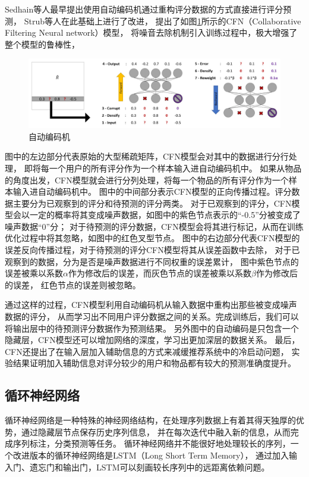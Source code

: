 Sedhain等人\parencite{sedhain2015autorec}最早提出使用自动编码机通过重构评分数据的方式直接进行评分预测，
Strub等人\parencite{strub2016hybrid}在此基础上进行了改进，
提出了如图\ref{fig:ae}所示的CFN（Collaborative Filtering Neural network）模型，
将噪音去除机制引入训练过程中，极大增强了整个模型的鲁棒性，

\begin{figure}[htbp]
\centering
\includegraphics[scale=0.22]{images/ae.jpeg}
\caption{自动编码机}
\label{fig:ae}
\end{figure}

图中的左边部分代表原始的大型稀疏矩阵，CFN模型会对其中的数据进行分行处理，
即将每一个用户的所有评分作为一个样本输入进自动编码机中。
如果从物品的角度出发，CFN模型就会进行分列处理，将每一个物品的所有评分作为一个样本输入进自动编码机中。
图中的中间部分表示CFN模型的正向传播过程。评分数据主要分为已观察到的评分和待预测的评分两类。
对于已观察到的评分，CFN模型会以一定的概率将其变成噪声数据，如图中的紫色节点表示的``-0.5''分被变成了噪声数据``0''分；
对于待预测的评分数据，CFN模型会将其进行标记，从而在训练优化过程中将其忽略，如图中的红色叉型节点。
图中的右边部分代表CFN模型的误差反向传播过程，对于待预测的评分CFN模型将其从误差函数中去除，
对于已观察到的数据，分为是否是噪声数据进行不同权重的误差累计，
图中紫色节点的误差被乘以系数$\alpha$作为修改后的误差，而灰色节点的误差被乘以系数$\beta$作为修改后的误差，
红色节点的误差则被忽略。

通过这样的过程，CFN模型利用自动编码机从输入数据中重构出那些被变成噪声数据的评分，
从而学习出不同用户评分数据之间的关系。完成训练后，我们可以将输出层中的待预测评分数据作为预测结果。
另外图中的自动编码是只包含一个隐藏层，CFN模型还可以增加网络的深度，学习出更加深层的数据关系。
最后，CFN还提出了在输入层加入辅助信息的方式来减缓推荐系统中的冷启动问题，
实验结果证明加入辅助信息对评分较少的用户和物品都有较大的预测准确度提升。

\subsection{循环神经网络}
循环神经网络是一种特殊的神经网络结构，在处理序列数据上有着其得天独厚的优势，通过隐藏层节点保存历史序列信息，
并在每次迭代中融入新的信息，从而完成序列标注，分类预测等任务。
循环神经网络并不能很好地处理较长的序列，一个改进版本的循环神经网络是LSTM（Long Short Term Memory），
通过加入输入门、遗忘门和输出门，LSTM可以刻画较长序列中的远距离依赖问题。

